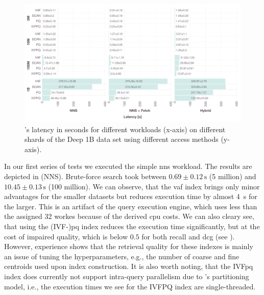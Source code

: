\begin{landscape}
    \begin{figure}[p]
        \centering
        \includegraphics[width=1.55\textwidth]{figures/bignns/cottontail/bignns-cottontail-runtime}
        \caption {\cottontail{}'s latency in seconds for different workloads (x-axis) on different shards of the Deep 1B data set using different access methods (y-axis).}
        \label{figure:cottontail_runtime}
    \end{figure}
\end{landscape}

In our first series of tests we executed the simple \acrshort{nns} workload. The results are depicted in  (NNS). Brute-force search took between $0.69 \pm 0.12 \, \si{\second}$ (5 million) and $10.45 \pm 0.13 \, \si{\second}$ (100 million). We can observe, that the \acrshort{vaf} index brings only minor advantages for the smaller datasets but reduces execution time by almost \SI{4}{\second} for the larger. This is an artifact of the query execution engine, which uses less than the assigned 32 workes because of the derived \acrshort{cpu} costs. We can also cleary see, that using the (IVF-)\acrshort{pq} index reduces the execution time significantly, but at the cost of impaired quality, which is below $0.5$ for both recall and \acrshort{dcg} (see ). However, experience shows that the retrieval quality for these indexes is mainly an issue of tuning the hyperparameters, e.g., the number of coarse and fine centroids used upon index construction. It is also worth noting, that the IVF\acrshort{pq} index does currently not support intra-query parallelism due to \cottontail{}'s partitioning model, i.e., the execution times we see for the IVFPQ index are single-threaded. 

